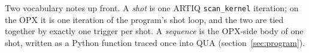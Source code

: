 \documentclass[11pt,a4paper]{article}
\newcommand{\code}[1]{\texttt{#1}}
\begin{document}
Two vocabulary notes up front. A \emph{shot} is one ARTIQ \code{scan\_kernel}
iteration; on the OPX it is one iteration of the program's shot loop, and the
two are tied together by exactly one trigger per shot. A \emph{sequence} is
the OPX-side body of one shot, written as a Python function traced once into
QUA (section~\ref{sec:program}).












\end{document}
